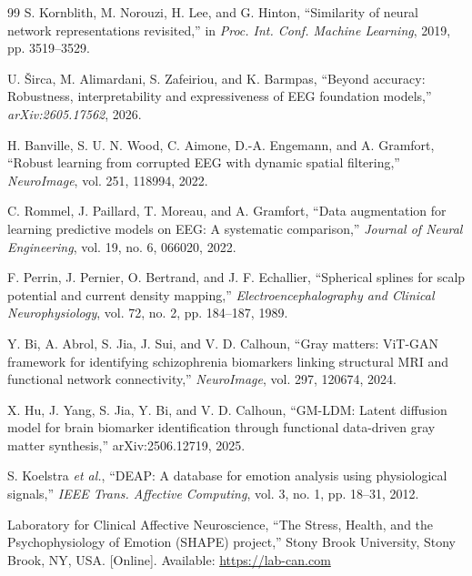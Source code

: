 \documentclass[conference]{IEEEtran}
\begin{document}
\begin{thebibliography}{99}
S. Kornblith, M. Norouzi, H. Lee, and G. Hinton, ``Similarity of neural network representations revisited,'' in \emph{Proc. Int. Conf. Machine Learning}, 2019, pp. 3519--3529.

U. \v{S}irca, M. Alimardani, S. Zafeiriou, and K. Barmpas, ``Beyond accuracy: Robustness, interpretability and expressiveness of EEG foundation models,'' \emph{arXiv:2605.17562}, 2026.

H. Banville, S. U. N. Wood, C. Aimone, D.-A. Engemann, and A. Gramfort, ``Robust learning from corrupted EEG with dynamic spatial filtering,'' \emph{NeuroImage}, vol. 251, 118994, 2022.

C. Rommel, J. Paillard, T. Moreau, and A. Gramfort, ``Data augmentation for learning predictive models on EEG: A systematic comparison,'' \emph{Journal of Neural Engineering}, vol. 19, no. 6, 066020, 2022.

F. Perrin, J. Pernier, O. Bertrand, and J. F. Echallier, ``Spherical splines for scalp potential and current density mapping,'' \emph{Electroencephalography and Clinical Neurophysiology}, vol. 72, no. 2, pp. 184--187, 1989.

Y. Bi, A. Abrol, S. Jia, J. Sui, and V. D. Calhoun, ``Gray matters: ViT-GAN framework for identifying schizophrenia biomarkers linking structural MRI and functional network connectivity,'' \emph{NeuroImage}, vol. 297, 120674, 2024.

X. Hu, J. Yang, S. Jia, Y. Bi, and V. D. Calhoun, ``GM-LDM: Latent diffusion model for brain biomarker identification through functional data-driven gray matter synthesis,'' arXiv:2506.12719, 2025.

S. Koelstra \emph{et al.}, ``DEAP: A database for emotion analysis using physiological signals,'' \emph{IEEE Trans. Affective Computing}, vol. 3, no. 1, pp. 18--31, 2012.

Laboratory for Clinical Affective Neuroscience, ``The Stress, Health, and the Psychophysiology of Emotion (SHAPE) project,'' Stony Brook University, Stony Brook, NY, USA. [Online]. Available: \url{https://lab-can.com}

\end{thebibliography}
\end{document}
